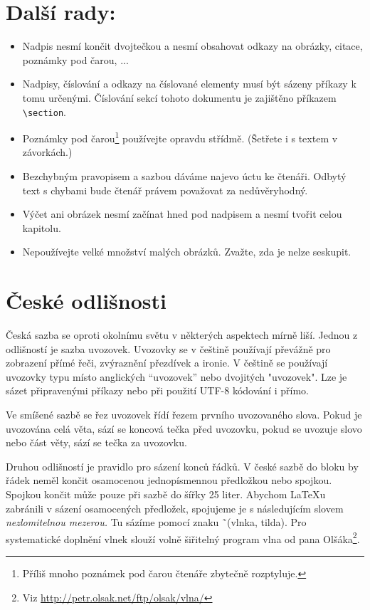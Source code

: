 \documentclass[a4paper, 10pt, twocolumn]{article}
\begin{document}
\section{Další rady:}
\begin{itemize}
\item Nadpis nesmí končit dvojtečkou a nesmí obsahovat odkazy na obrázky, citace, poznámky pod čarou, ...
\item Nadpisy, číslování a odkazy na číslované elementy musí být sázeny příkazy k tomu určenými. Číslování sekcí tohoto dokumentu je zajištěno příkazem \verb$\section$.
\item Poznámky pod čarou\footnote[1]{Příliš mnoho poznámek pod čarou čtenáře zbytečně rozptyluje.} používejte opravdu střídmě. (Šetřete i s textem v závorkách.)
\item Bezchybným pravopisem a sazbou dáváme najevo úctu ke čtenáři. Odbytý text s chybami bude čtenář právem považovat za nedůvěryhodný.
\item Výčet ani obrázek nesmí začínat hned pod nadpisem a nesmí tvořit celou kapitolu.
\item Nepoužívejte velké množství malých obrázků. Zvažte, zda je nelze seskupit.
\end{itemize}

\section{České odlišnosti}
Česká sazba se oproti okolnímu světu v některých aspektech mírně liší.
Jednou z odlišností je sazba uvozovek. Uvozovky se v češtině používají převážně pro zobrazení přímé řeči, zvýraznění přezdívek a ironie.
V češtině se používají uvozovky typu  místo anglických ``uvozovek'' nebo dvojitých "uvozovek".
Lze je sázet připravenými příkazy nebo při použití UTF-8 kódování i přímo.

Ve smíšené sazbě se řez uvozovek řídí řezem prvního uvozovaného slova.
Pokud je uvozována celá věta, sází se koncová tečka před uvozovku, pokud se uvozuje slovo nebo část věty, sází se tečka za uvozovku.

Druhou odlišností je pravidlo pro sázení konců řádků.
V české sazbě do bloku by řádek neměl končit osamocenou jednopísmennou předložkou nebo spojkou.
Spojkou  končit může pouze při sazbě do šířky 25 liter.
Abychom \LaTeX u zabránili v sázení osamocených předložek, spojujeme je s následujícím slovem \emph{nezlomitelnou mezerou.}
Tu sázíme pomocí znaku \~\ (vlnka, tilda). Pro systematické doplnění vlnek slouží volně šiřitelný program vlna od pana Olšáka\footnote[2]{Viz \url{http://petr.olsak.net/ftp/olsak/vlna/}}.
\end{document}
